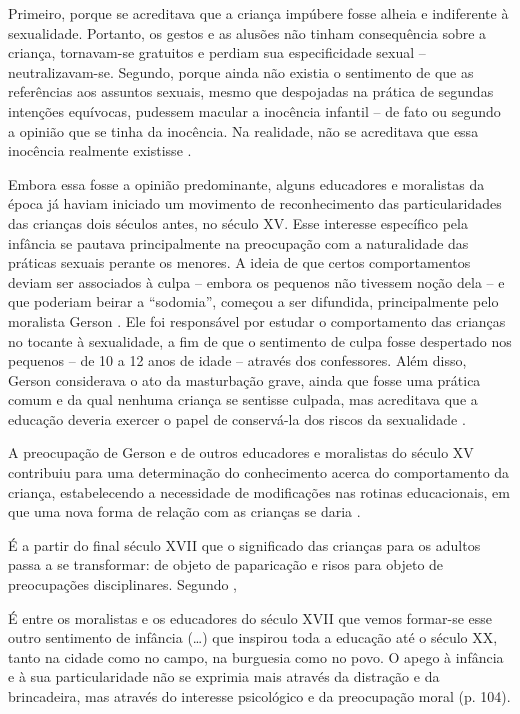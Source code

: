 \begin{citacao}
	Primeiro, porque se acreditava que a criança impúbere fosse alheia e indiferente à sexualidade. Portanto, os gestos e as alusões não tinham consequência sobre a criança, tornavam-se gratuitos e perdiam sua especificidade sexual -- neutralizavam-se. Segundo, porque ainda não existia o sentimento de que as referências aos assuntos sexuais, mesmo que despojadas na prática de segundas intenções equívocas, pudessem macular a inocência infantil -- de fato ou segundo a opinião que se tinha da inocência. Na realidade, não se acreditava que essa inocência realmente existisse \cite[p. 132]{ARIES1981}.
\end{citacao}

Embora essa fosse a opinião predominante, alguns educadores e moralistas da época já haviam iniciado um movimento de reconhecimento das particularidades das crianças dois séculos antes, no século XV. Esse interesse específico pela infância se pautava principalmente na preocupação com a naturalidade das práticas sexuais perante os menores. A ideia de que certos comportamentos deviam ser associados à culpa -- embora os pequenos não tivessem noção dela -- e que poderiam beirar a ``sodomia'', começou a ser difundida, principalmente pelo moralista Gerson \cite[p. 80]{ARIES2011}. Ele foi responsável por estudar o comportamento das crianças no tocante à sexualidade, a fim de que o sentimento de culpa fosse despertado nos pequenos -- de 10 a 12 anos de idade -- através dos confessores. Além disso, Gerson considerava o ato da masturbação grave, ainda que fosse uma prática comum e da qual nenhuma criança se sentisse culpada, mas acreditava que a educação deveria exercer o papel de conservá-la dos riscos da sexualidade \cite{ARIES2011}.

A preocupação de Gerson e de outros educadores e moralistas do século XV contribuiu para uma determinação do conhecimento acerca do comportamento da criança, estabelecendo a necessidade de modificações nas rotinas educacionais, em que uma nova forma de relação com as crianças se daria \cite{ARIES2011}.

É a partir do final século XVII que o significado das crianças para os adultos passa a se transformar: de objeto de paparicação e risos para objeto de preocupações disciplinares. Segundo ,

\begin{citacao}
	É entre os moralistas e os educadores do século XVII que vemos formar-se esse outro sentimento de infância (…) que inspirou toda a educação até o século XX, tanto na cidade como no campo, na burguesia como no povo. O apego à infância e à sua particularidade não se exprimia mais através da distração e da brincadeira, mas através do interesse psicológico e da preocupação moral (p. 104).
\end{citacao}


